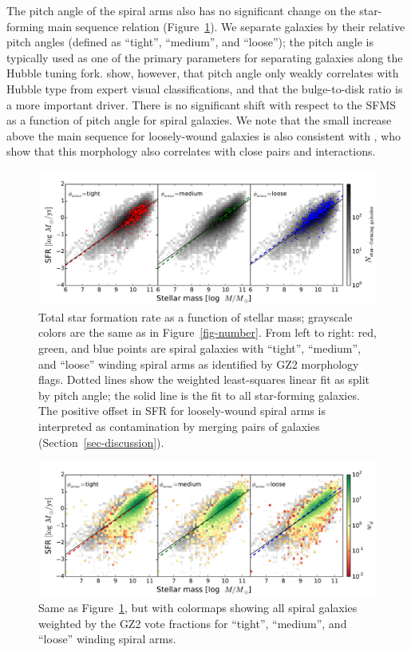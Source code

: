 \documentclass[useAMS,usenatbib]{mn2e}
\begin{document}
The pitch angle of the spiral arms also has no significant change on the star-forming main sequence relation (Figure~\ref{fig-winding}). We separate galaxies by their relative pitch angles (defined as ``tight'', ``medium'', and ``loose''); the pitch angle is typically used as one of the primary parameters for separating galaxies along the Hubble tuning fork. \citet{wil13} show, however, that pitch angle only weakly correlates with Hubble type from expert visual classifications, and that the bulge-to-disk ratio is a more important driver. There is no significant shift with respect to the SFMS as a function of pitch angle for spiral galaxies. We note that the small increase above the main sequence for loosely-wound galaxies is also consistent with \citet{cas13}, who show that this morphology also correlates with close pairs and interactions. 

\begin{figure}
\includegraphics[angle=0,width=7.0in]{figures/ms_arms_winding.pdf}
\caption{Total star formation rate as a function of stellar mass; grayscale colors are the same as in Figure~\ref{fig-number}. From left to right: red, green, and blue points are spiral galaxies with ``tight'', ``medium'', and ``loose'' winding spiral arms as identified by GZ2 morphology flags. Dotted lines show the weighted least-squares linear fit as split by pitch angle; the solid line is the fit to all star-forming galaxies. The positive offset in SFR for loosely-wound spiral arms is interpreted as contamination by merging pairs of galaxies (Section~\ref{sec-discussion}).
\label{fig-winding}}
\end{figure}

\begin{figure}
\includegraphics[angle=0,width=7.0in]{figures/ms_arms_winding_weighted.pdf}
\caption{Same as Figure~\ref{fig-winding}, but with colormaps showing all spiral galaxies weighted by the GZ2 vote fractions for ``tight'', ``medium'', and ``loose'' winding spiral arms. 
\label{fig-winding_weighted}}
\end{figure}
\end{document}
